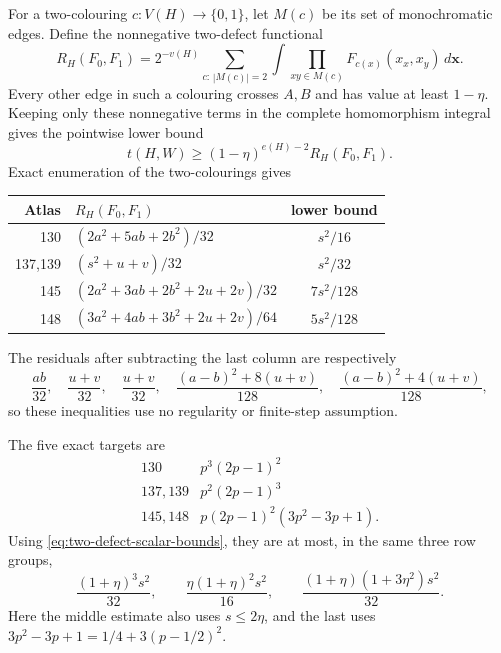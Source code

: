 \documentclass[11pt]{article}
\begin{document}
For a two-colouring $c:V(H)\to\{0,1\}$, let $M(c)$ be its set of
monochromatic edges.  Define the nonnegative two-defect functional
\[
 R_H(F_0,F_1)=2^{-v(H)}
 \sum_{c:\,|M(c)|=2}
 \int\prod_{xy\in M(c)}F_{c(x)}(x_x,x_y)\,d\boldsymbol{x}.
\]
Every other edge in such a colouring crosses $A,B$ and has value at least
$1-\eta$.  Keeping only these nonnegative terms in the complete
homomorphism integral gives the pointwise lower bound
\begin{equation}
 t(H,W)\geq(1-\eta)^{e(H)-2}R_H(F_0,F_1).
 \label{eq:two-defect-hom-lower}
\end{equation}
Exact enumeration of the two-colourings gives
\begin{center}
\begin{tabular}{r|l|c}
Atlas&$R_H(F_0,F_1)$&lower bound\\ \hline
130&$(2a^2+5ab+2b^2)/32$&$s^2/16$\\
137,139&$(s^2+u+v)/32$&$s^2/32$\\
145&$(2a^2+3ab+2b^2+2u+2v)/32$&$7s^2/128$\\
148&$(3a^2+4ab+3b^2+2u+2v)/64$&$5s^2/128$
\end{tabular}
\end{center}
The residuals after subtracting the last column are respectively
\[
 \frac{ab}{32},\quad
 \frac{u+v}{32},\quad
 \frac{u+v}{32},\quad
 \frac{(a-b)^2+8(u+v)}{128},\quad
 \frac{(a-b)^2+4(u+v)}{128},
\]
so these inequalities use no regularity or finite-step assumption.

The five exact targets are
\[
\begin{array}{c|c}
130&p^3(2p-1)^2\\
137,139&p^2(2p-1)^3\\
145,148&p(2p-1)^2(3p^2-3p+1).
\end{array}
\]
Using \eqref{eq:two-defect-scalar-bounds}, they are at most, in the same
three row groups,
\begin{equation}
 \frac{(1+\eta)^3s^2}{32},\qquad
 \frac{\eta(1+\eta)^2s^2}{16},\qquad
 \frac{(1+\eta)(1+3\eta^2)s^2}{32}.
 \label{eq:two-defect-target-upper}
\end{equation}
Here the middle estimate also uses $s\leq2\eta$, and the last uses
$3p^2-3p+1=1/4+3(p-1/2)^2$.
\end{document}
